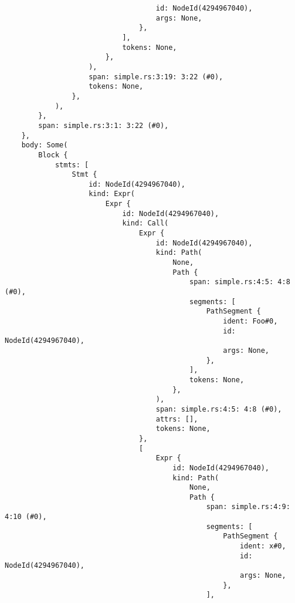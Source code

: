 \documentclass[
  11pt,
  twoside,symmetric]{report}
\begin{document}
\begin{verbatim}
                                    id: NodeId(4294967040),
                                    args: None,
                                },
                            ],
                            tokens: None,
                        },
                    ),
                    span: simple.rs:3:19: 3:22 (#0),
                    tokens: None,
                },
            ),
        },
        span: simple.rs:3:1: 3:22 (#0),
    },
    body: Some(
        Block {
            stmts: [
                Stmt {
                    id: NodeId(4294967040),
                    kind: Expr(
                        Expr {
                            id: NodeId(4294967040),
                            kind: Call(
                                Expr {
                                    id: NodeId(4294967040),
                                    kind: Path(
                                        None,
                                        Path {
                                            span: simple.rs:4:5: 4:8 (#0),
                                            segments: [
                                                PathSegment {
                                                    ident: Foo#0,
                                                    id: NodeId(4294967040),
                                                    args: None,
                                                },
                                            ],
                                            tokens: None,
                                        },
                                    ),
                                    span: simple.rs:4:5: 4:8 (#0),
                                    attrs: [],
                                    tokens: None,
                                },
                                [
                                    Expr {
                                        id: NodeId(4294967040),
                                        kind: Path(
                                            None,
                                            Path {
                                                span: simple.rs:4:9: 4:10 (#0),
                                                segments: [
                                                    PathSegment {
                                                        ident: x#0,
                                                        id: NodeId(4294967040),
                                                        args: None,
                                                    },
                                                ],

\end{verbatim}
\end{document}
